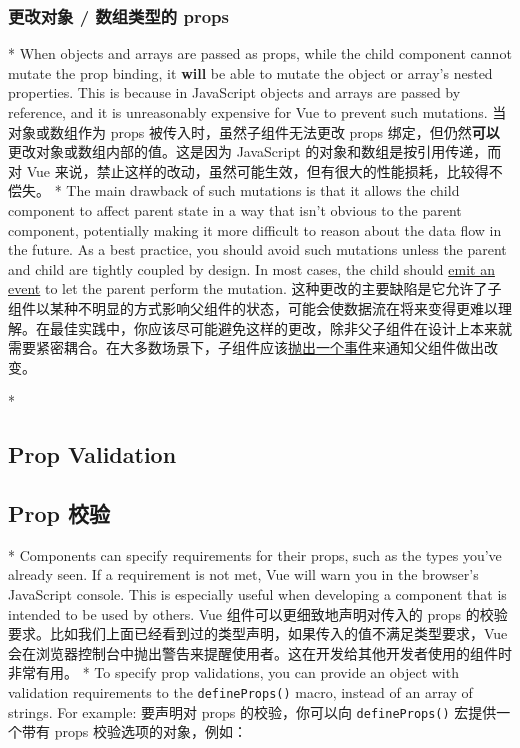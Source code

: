 \begin{paracol}{2}
\subsubsection{更改对象 / 数组类型的 props}
\switchcolumn[0]*%
When objects and arrays are passed as props, while the child component
cannot mutate the prop binding, it \textbf{will} be able to mutate the
object or array's nested properties. This is because in JavaScript
objects and arrays are passed by reference, and it is unreasonably
expensive for Vue to prevent such mutations.
\switchcolumn
当对象或数组作为 props 被传入时，虽然子组件无法更改 props
绑定，但仍然\textbf{可以}更改对象或数组内部的值。这是因为 JavaScript
的对象和数组是按引用传递，而对 Vue
来说，禁止这样的改动，虽然可能生效，但有很大的性能损耗，比较得不偿失。
\switchcolumn[0]*%
The main drawback of such mutations is that it allows the child
component to affect parent state in a way that isn't obvious to the
parent component, potentially making it more difficult to reason about
the data flow in the future. As a best practice, you should avoid such
mutations unless the parent and child are tightly coupled by design. In
most cases, the child should
\href{https://vuejs.org/guide/components/events.html}{emit an event} to
let the parent perform the mutation.
\switchcolumn
这种更改的主要缺陷是它允许了子组件以某种不明显的方式影响父组件的状态，可能会使数据流在将来变得更难以理解。在最佳实践中，你应该尽可能避免这样的更改，除非父子组件在设计上本来就需要紧密耦合。在大多数场景下，子组件应该\href{https://cn.vuejs.org/guide/components/events.html}{抛出一个事件}来通知父组件做出改变。
\end{paracol}

\begin{paracol}{2}

\switchcolumn[0]*%
\subsection{Prop Validation}
\switchcolumn
\subsection{Prop 校验}
\switchcolumn[0]*%
Components can specify requirements for their props, such as the types
you've already seen. If a requirement is not met, Vue will warn you in
the browser's JavaScript console. This is especially useful when
developing a component that is intended to be used by others.
\switchcolumn
Vue 组件可以更细致地声明对传入的 props
的校验要求。比如我们上面已经看到过的类型声明，如果传入的值不满足类型要求，Vue
会在浏览器控制台中抛出警告来提醒使用者。这在开发给其他开发者使用的组件时非常有用。
\switchcolumn[0]*%
To specify prop validations, you can provide an object with validation
requirements to the \texttt{defineProps()} macro, instead of an array of
strings. For example:
\switchcolumn
要声明对 props 的校验，你可以向 \texttt{defineProps()} 宏提供一个带有
props 校验选项的对象，例如：
\end{paracol}

